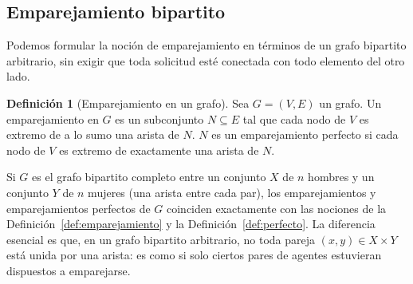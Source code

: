 \documentclass[12pt, spanish, oneside, openany]{book}
\theoremstyle{uprightplain}
\theoremstyle{definition}
\newtheorem{definicion}[teorema]{Definición}
\theoremstyle{remark}
\theoremstyle{definition}
\begin{document}
\subsection{Emparejamiento bipartito}
\label{subsec:bipartite-matching}

Podemos formular la noción de emparejamiento en términos de un grafo bipartito arbitrario, sin exigir que toda solicitud esté conectada con todo elemento del otro lado.

\begin{definicion}[Emparejamiento en un grafo]
\label{def:matching-grafo}
Sea $G=(V,E)$ un grafo. Un emparejamiento en $G$ es un subconjunto $N \subseteq E$ tal que cada nodo de $V$ es extremo de a lo sumo una arista de $N$. $N$ es un emparejamiento perfecto si cada nodo de $V$ es extremo de exactamente una arista de $N$.
\end{definicion}

Si $G$ es el grafo bipartito completo entre un conjunto $X$ de $n$ hombres y un conjunto $Y$ de $n$ mujeres (una arista entre cada par), los emparejamientos y emparejamientos perfectos de $G$ coinciden exactamente con las nociones de la Definición~\ref{def:emparejamiento} y la Definición~\ref{def:perfecto}. La diferencia esencial es que, en un grafo bipartito arbitrario, no toda pareja $(x,y) \in X \times Y$ está unida por una arista: es como si solo ciertos pares de agentes estuvieran dispuestos a emparejarse.
\end{document}
